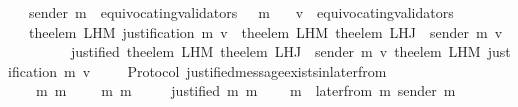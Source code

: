 \begin{isabellebody}
\ \ {\isasymlongrightarrow}\ sender\ m\ {\isasymnotin}\ equivocating{\isacharunderscore}validators\ {\isacharparenleft}{\isasymsigma}\ {\isasymunion}\ {\isacharbraceleft}m{\isacharbraceright}{\isacharparenright}\isanewline
\ \ {\isasymlongrightarrow}\ v\ {\isasymnotin}\ equivocating{\isacharunderscore}validators\ {\isasymsigma}\isanewline
\ \ {\isasymlongrightarrow}\ the{\isacharunderscore}elem\ {\isacharparenleft}L{\isacharunderscore}H{\isacharunderscore}M\ {\isacharparenleft}justification\ m{\isacharparenright}\ v{\isacharparenright}\ {\isacharequal}\ the{\isacharunderscore}elem\ {\isacharparenleft}L{\isacharunderscore}H{\isacharunderscore}M\ {\isacharparenleft}the{\isacharunderscore}elem\ {\isacharparenleft}L{\isacharunderscore}H{\isacharunderscore}J\ {\isasymsigma}\ {\isacharparenleft}sender\ m{\isacharparenright}{\isacharparenright}{\isacharparenright}\ v{\isacharparenright}\isanewline
\ \ \ \ \ \ \ \ {\isasymor}\ justified\ {\isacharparenleft}the{\isacharunderscore}elem\ {\isacharparenleft}L{\isacharunderscore}H{\isacharunderscore}M\ {\isacharparenleft}the{\isacharunderscore}elem\ {\isacharparenleft}L{\isacharunderscore}H{\isacharunderscore}J\ {\isasymsigma}\ {\isacharparenleft}sender\ m{\isacharparenright}{\isacharparenright}{\isacharparenright}\ v{\isacharparenright}{\isacharparenright}\ {\isacharparenleft}the{\isacharunderscore}elem\ {\isacharparenleft}L{\isacharunderscore}H{\isacharunderscore}M\ {\isacharparenleft}justification\ m{\isacharparenright}\ v{\isacharparenright}{\isacharparenright}{\isachardoublequoteclose}\isanewline
%
\isadelimproof
\ \ %
\endisadelimproof
%
\isatagproof
{}\isamarkupfalse%
%
\endisatagproof
{\isafoldproof}%
%
\isadelimproof
\isanewline
%
\endisadelimproof
\isanewline
\isanewline
{}\isamarkupfalse%
\ {\isacharparenleft}\ Protocol{\isacharparenright}\ justified{\isacharunderscore}message{\isacharunderscore}exists{\isacharunderscore}in{\isacharunderscore}later{\isacharunderscore}from{\isacharcolon}\isanewline
\ \ {\isachardoublequoteopen}{\isasymforall}\ {\isasymsigma}\ m{}\ m{}{\isachardot}\ {\isasymsigma}\ {\isasymin}\ {\isasymSigma}\ {\isasymand}\ {\isacharbraceleft}m{}{\isacharcomma}\ m{}{\isacharbraceright}\ {\isasymsubseteq}\ {\isasymsigma}\isanewline
\ \ {\isasymlongrightarrow}\ justified\ m{}\ m{}\ \isanewline
\ \ {\isasymlongrightarrow}\ m{}\ {\isasymin}\ later{\isacharunderscore}from\ {\isacharparenleft}m{}{\isacharcomma}\ sender\ m{}{\isacharcomma}\ {\isasymsigma}{\isacharparenright}{\isachardoublequoteclose}\isanewline

\end{isabellebody}
